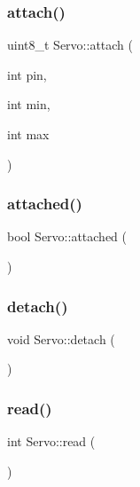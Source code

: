 \subsubsection{\texorpdfstring{attach()}{attach()}\hspace{0.1cm}{\footnotesize\ttfamily [2/2]}}
{\footnotesize\ttfamily uint8\+\_\+t Servo\+::attach (\begin{DoxyParamCaption}\item[{int}]{pin,  }\item[{int}]{min,  }\item[{int}]{max }\end{DoxyParamCaption})}

\mbox{\label{class_servo_a48607d47aa5678780b1b927102bd3b1b}} 
\subsubsection{\texorpdfstring{attached()}{attached()}}
{\footnotesize\ttfamily bool Servo\+::attached (\begin{DoxyParamCaption}{ }\end{DoxyParamCaption})}

\mbox{\label{class_servo_a0b69ccc5c8b348ebaa84be91d973a362}} 
\subsubsection{\texorpdfstring{detach()}{detach()}}
{\footnotesize\ttfamily void Servo\+::detach (\begin{DoxyParamCaption}{ }\end{DoxyParamCaption})}

\mbox{\label{class_servo_aaca0af33ba7d7c87c8a785b8eabf95a7}} 
\subsubsection{\texorpdfstring{read()}{read()}}
{\footnotesize\ttfamily int Servo\+::read (\begin{DoxyParamCaption}{ }\end{DoxyParamCaption})}

